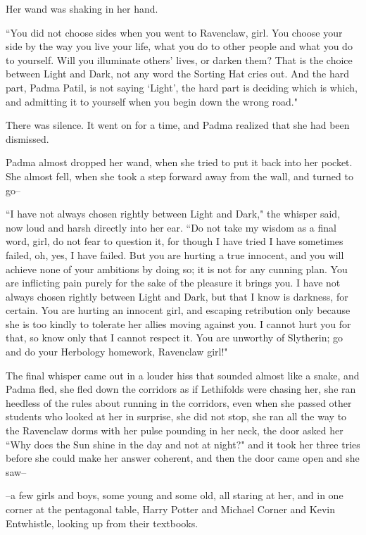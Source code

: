 Her wand was shaking in her hand.

``You did not choose sides when you went to Ravenclaw, girl. You choose your side by the way you live your life, what you do to other people and what you do to yourself. Will you illuminate others' lives, or darken them? That is the choice between Light and Dark, not any word the Sorting Hat cries out. And the hard part, Padma Patil, is not saying `Light', the hard part is deciding which is which, and admitting it to yourself when you begin down the wrong road."

There was silence. It went on for a time, and Padma realized that she had been dismissed.

Padma almost dropped her wand, when she tried to put it back into her pocket. She almost fell, when she took a step forward away from the wall, and turned to go\---

``I have not always chosen rightly between Light and Dark," the whisper said, now loud and harsh directly into her ear. ``Do not take my wisdom as a final word, girl, do not fear to question it, for though I have tried I have sometimes failed, oh, yes, I have failed. But you are hurting a true innocent, and you will achieve none of your ambitions by doing so; it is not for any cunning plan. You are inflicting pain purely for the sake of the pleasure it brings you. I have not always chosen rightly between Light and Dark, but that I know is darkness, for certain. You are hurting an innocent girl, and escaping retribution only because she is too kindly to tolerate her allies moving against you. I cannot hurt you for that, so know only that I cannot respect it. You are unworthy of Slytherin; go and do your Herbology homework, Ravenclaw girl!"

The final whisper came out in a louder hiss that sounded almost like a snake, and Padma fled, she fled down the corridors as if Lethifolds were chasing her, she ran heedless of the rules about running in the corridors, even when she passed other students who looked at her in surprise, she did not stop, she ran all the way to the Ravenclaw dorms with her pulse pounding in her neck, the door asked her ``Why does the Sun shine in the day and not at night?" and it took her three tries before she could make her answer coherent, and then the door came open and she saw\---

\---a few girls and boys, some young and some old, all staring at her, and in one corner at the pentagonal table, Harry Potter and Michael Corner and Kevin Entwhistle, looking up from their textbooks.


